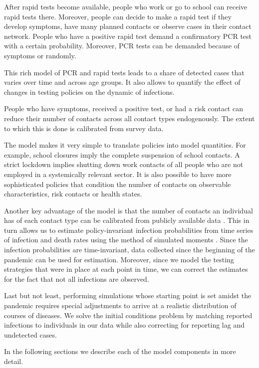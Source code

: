 After rapid tests become available, people who work or go to school can receive rapid
tests there. Moreover, people can decide to make a rapid test if they develop symptoms,
have many planned contacts or observe cases in their contact network. People who have a
positive rapid test demand a confirmatory PCR test with a certain probability. Moreover,
PCR tests can be demanded because of symptoms or randomly.

This rich model of PCR and rapid tests leads to a share of detected cases that varies
over time and across age groups. It also allows to quantify the effect of changes in
testing policies on the dynamic of infections.

People who have symptoms, received a positive test, or had a risk contact can reduce
their number of contacts across all contact types endogenously. The extent to which this
is done is calibrated from survey data.

The model makes it very simple to translate policies into model quantities. For example,
school closures imply the complete suspension of school contacts. A strict lockdown
implies shutting down work contacts of all people who are not employed in a systemically
relevant sector. It is also possible to have more sophisticated policies that condition
the number of contacts on observable characteristics, risk contacts or health states.

Another key advantage of the model is that the number of contacts an individual has of
each contact type can be calibrated from publicly available data \citep{Mossong2008}.
This in turn allows us to estimate policy-invariant infection probabilities from time
series of infection and death rates using the method of simulated moments
\citep{McFadden1989}. Since the infection probabilities are time-invariant, data
collected since the beginning of the pandemic can be used for estimation. Moreover,
since we model the testing strategies that were in place at each point in time, we can
correct the estimates for the fact that not all infections are observed.

Last but not least, performing simulations whose starting point is set amidst the
pandemic requires special adjustments to arrive at a realistic distribution of courses
of diseases. We solve the initial conditions problem by matching reported infections to
individuals in our data while also correcting for reporting lag and undetected cases.

In the following sections we describe each of the model components in more detail.
